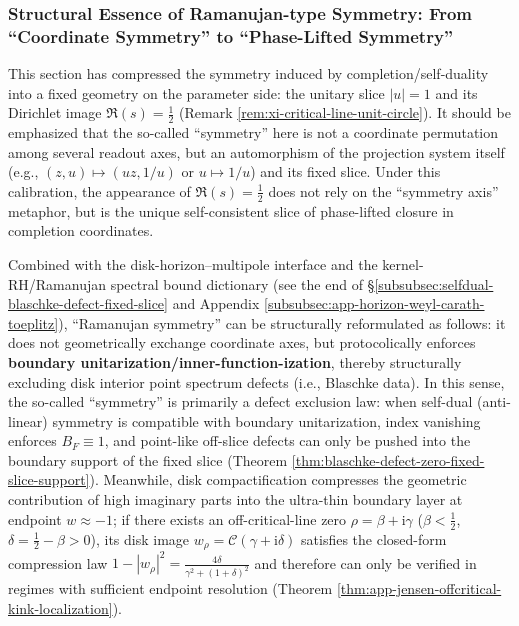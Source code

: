 \subsubsection{Structural Essence of Ramanujan-type Symmetry: From ``Coordinate Symmetry'' to ``Phase-Lifted Symmetry''}\label{subsubsec:ramanujan-phase-lift-symmetry}
This section has compressed the symmetry induced by completion/self-duality into a fixed geometry on the parameter side: the unitary slice \(|u|=1\) and its Dirichlet image \(\Re(s)=\tfrac12\) (Remark \ref{rem:xi-critical-line-unit-circle}).
It should be emphasized that the so-called ``symmetry'' here is not a coordinate permutation among several readout axes, but an automorphism of the projection system itself (e.g., \((z,u)\mapsto(uz,1/u)\) or \(u\mapsto 1/u\)) and its fixed slice.
Under this calibration, the appearance of \(\Re(s)=\tfrac12\) does not rely on the ``symmetry axis'' metaphor, but is the unique self-consistent slice of phase-lifted closure in completion coordinates.
\par
Combined with the disk-horizon--multipole interface and the kernel-RH/Ramanujan spectral bound dictionary (see the end of \S\ref{subsubsec:selfdual-blaschke-defect-fixed-slice} and Appendix \ref{subsubsec:app-horizon-weyl-carath-toeplitz}), ``Ramanujan symmetry'' can be structurally reformulated as follows: it does not geometrically exchange coordinate axes, but protocolically enforces \textbf{boundary unitarization/inner-function-ization}, thereby structurally excluding disk interior point spectrum defects (i.e., Blaschke data).
In this sense, the so-called ``symmetry'' is primarily a defect exclusion law: when self-dual (anti-linear) symmetry is compatible with boundary unitarization, index vanishing enforces \(B_F\equiv 1\), and point-like off-slice defects can only be pushed into the boundary support of the fixed slice (Theorem \ref{thm:blaschke-defect-zero-fixed-slice-support}).
Meanwhile, disk compactification compresses the geometric contribution of high imaginary parts into the ultra-thin boundary layer at endpoint \(w\approx-1\); if there exists an off-critical-line zero \(\rho=\beta+\mathrm{i}\gamma\) (\(\beta<\tfrac12\), \(\delta=\tfrac12-\beta>0\)), its disk image \(w_\rho=\mathcal{C}(\gamma+\mathrm{i}\delta)\) satisfies the closed-form compression law
\(
1-|w_\rho|^2=\frac{4\delta}{\gamma^2+(1+\delta)^2}
\)
and therefore can only be verified in regimes with sufficient endpoint resolution (Theorem \ref{thm:app-jensen-offcritical-kink-localization}).


